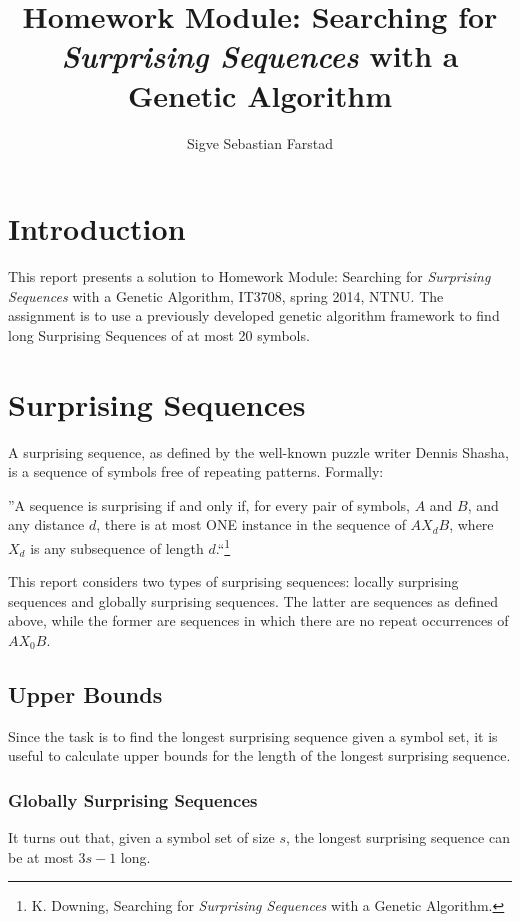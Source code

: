 \documentclass[twocolumn,oneside]{amsart}
\title{Homework Module: \textbf{Searching for \textit{Surprising Sequences} with a Genetic Algorithm}}
\author{Sigve Sebastian Farstad}
\begin{document}
\maketitle

\section{Introduction}

This report presents a solution to Homework Module: Searching for \textit{Surprising Sequences} with a Genetic Algorithm, IT3708, spring 2014, NTNU.
The assignment is to use a previously developed genetic algorithm framework to find long Surprising Sequences of at most 20 symbols.

\section{Surprising Sequences}

A surprising sequence, as defined by the well-known puzzle writer Dennis Shasha, is a sequence of symbols free of repeating patterns. Formally:

''A sequence is surprising if and only if, for every pair of symbols, $ A $ and $ B $, and any distance $ d $, there is at most ONE instance in the sequence of $ AX_dB$, where $ X_d $ is any subsequence of length $ d $.``\footnote{K. Downing, Searching for \textit{Surprising Sequences} with a Genetic Algorithm.}

This report considers two types of surprising sequences: locally surprising sequences and globally surprising sequences.
The latter are sequences as defined above, while the former are sequences in which there are no repeat occurrences of $ AX_0B $.

\subsection{Upper Bounds}
Since the task is to find the longest surprising sequence given a symbol set, it is useful to calculate upper bounds for the length of the longest surprising sequence.

\subsubsection{Globally Surprising Sequences}

It turns out that, given a symbol set of size $ s $, the longest surprising sequence can be at most $ 3s - 1 $ long.
\end{document}
